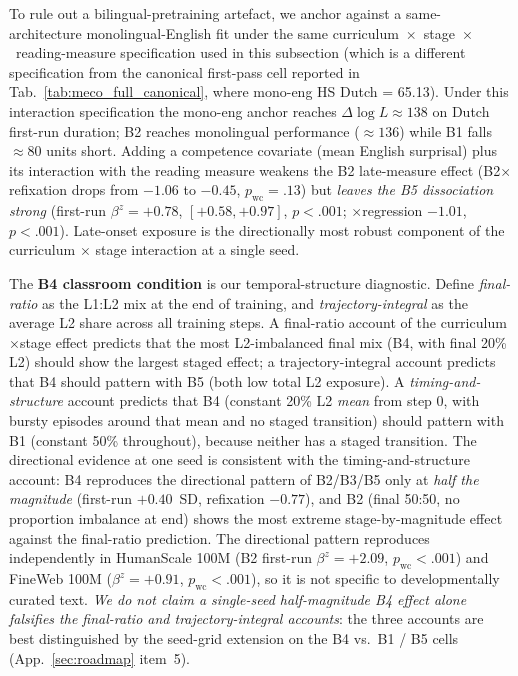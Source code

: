 To rule out a bilingual-pretraining artefact, we anchor against a same-architecture monolingual-English \beetle{} fit under the same curriculum~$\times$~stage~$\times$~reading-measure specification used in this subsection (which is a different specification from the canonical first-pass cell reported in Tab.~\ref{tab:meco_full_canonical}, where mono-eng HS Dutch = 65.13). Under this interaction specification the mono-eng anchor reaches $\Delta\log L \approx 138$ on Dutch first-run duration; B2 reaches monolingual performance ($\approx 136$) while B1 falls $\approx 80$ units short. Adding a competence covariate (mean English surprisal) plus its interaction with the reading measure weakens the B2 late-measure effect (B2$\times$refixation drops from $-1.06$ to $-0.45$, $p_{\mathrm{wc}}{=}.13$) but \emph{leaves the B5 dissociation strong} (first-run $\beta^{z}{=}{+}0.78$, $[+0.58, +0.97]$, $p{<}.001$; $\times$regression $-1.01$, $p{<}.001$). Late-onset exposure is the directionally most robust component of the curriculum $\times$ stage interaction at a single seed.

The \textbf{B4 classroom condition} is our temporal-structure diagnostic. Define \emph{final-ratio} as the L1:L2 mix at the end of training, and \emph{trajectory-integral} as the average L2 share across all training steps. A final-ratio account of the curriculum$\times$stage effect predicts that the most L2-imbalanced final mix (B4, with final 20\% L2) should show the largest staged effect; a trajectory-integral account predicts that B4 should pattern with B5 (both low total L2 exposure). A \emph{timing-and-structure} account predicts that B4 (constant 20\% L2 \emph{mean} from step 0, with bursty episodes around that mean and no staged transition) should pattern with B1 (constant 50\% throughout), because neither has a staged transition. The directional evidence at one seed is consistent with the timing-and-structure account: B4 reproduces the directional pattern of B2/B3/B5 only at \emph{half the magnitude} (first-run $+0.40$~SD, refixation $-0.77$), and B2 (final 50:50, no proportion imbalance at end) shows the most extreme stage-by-magnitude effect against the final-ratio prediction. The directional pattern reproduces independently in HumanScale 100M (B2 first-run $\beta^{z}{=}{+}2.09$, $p_{\mathrm{wc}}{<}.001$) and FineWeb 100M ($\beta^{z}{=}{+}0.91$, $p_{\mathrm{wc}}{<}.001$), so it is not specific to developmentally curated text. \emph{We do not claim a single-seed half-magnitude B4 effect alone falsifies the final-ratio and trajectory-integral accounts}: the three accounts are best distinguished by the seed-grid extension on the B4 vs.\ B1 / B5 cells (App.~\ref{sec:roadmap} item~5).

